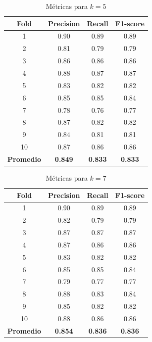 \documentclass[conference]{IEEEtran}
\begin{document}
\begin{table}[ht]
    \centering
    \begin{tabular}{cccc}
        \textbf{Fold} & \textbf{Precision} & \textbf{Recall} & \textbf{F1-score} \\
        \hline
        1 & 0.90 & 0.89 & 0.89 \\
        2 & 0.81 & 0.79 & 0.79 \\
        3 & 0.86 & 0.86 & 0.86 \\
        4 & 0.88 & 0.87 & 0.87 \\
        5 & 0.83 & 0.82 & 0.82 \\
        6 & 0.85 & 0.85 & 0.84 \\
        7 & 0.78 & 0.76 & 0.77 \\
        8 & 0.87 & 0.82 & 0.82 \\
        9 & 0.84 & 0.81 & 0.81 \\
        10 & 0.87 & 0.86 & 0.86 \\
        \hline
        \textbf{Promedio} & \textbf{0.849} & \textbf{0.833} & \textbf{0.833} \\
    \end{tabular}
    \caption{Métricas para \( k = 5 \)}
    \label{tab:knn5}
\end{table}

\begin{table}[ht]
    \centering
    \begin{tabular}{cccc}
        \textbf{Fold} & \textbf{Precision} & \textbf{Recall} & \textbf{F1-score} \\
        \hline
        1 & 0.90 & 0.89 & 0.89 \\
        2 & 0.82 & 0.79 & 0.79 \\
        3 & 0.87 & 0.87 & 0.87 \\
        4 & 0.87 & 0.86 & 0.86 \\
        5 & 0.83 & 0.82 & 0.82 \\
        6 & 0.85 & 0.85 & 0.84 \\
        7 & 0.79 & 0.77 & 0.77 \\
        8 & 0.88 & 0.83 & 0.84 \\
        9 & 0.85 & 0.82 & 0.82 \\
        10 & 0.88 & 0.86 & 0.86 \\
        \hline
        \textbf{Promedio} & \textbf{0.854} & \textbf{0.836} & \textbf{0.836} \\
    \end{tabular}
    \caption{Métricas para \( k = 7 \)}
    \label{tab:knn7}
\end{table}
\end{document}
